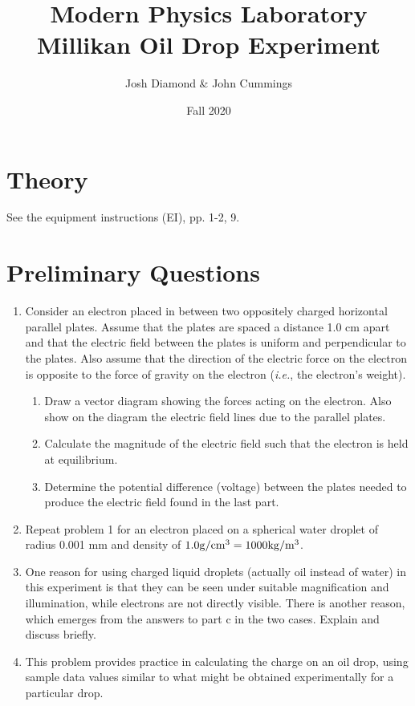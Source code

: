 \documentclass{article}
\title{Modern Physics Laboratory\\
Millikan Oil Drop Experiment}
\author{Josh Diamond \& John Cummings}
\date{Fall 2020}
\begin{document}
\maketitle


\section{Theory}

See the equipment instructions (EI), pp. 1-2, 9.

\section{Preliminary Questions}

\begin{enumerate}
\item Consider an electron placed in between two oppositely charged
horizontal parallel plates.  Assume that the plates are spaced a
distance 1.0 cm apart and that the electric field between the plates is
uniform and perpendicular to the plates.  Also assume that the
direction of the electric force on the electron is opposite to the
force of gravity on the electron ({\em i.e.}, the electron's
weight).
	\begin{enumerate}
	\item Draw a vector diagram showing the forces acting on the electron.  Also
show on the diagram the electric field lines due to the parallel plates.
	\item Calculate the magnitude of the electric field such that the electron is
held at equilibrium.
	\item Determine the potential difference (voltage) between the plates needed
to produce the electric field found in the last part.
	\end{enumerate}

\item Repeat problem 1 for an electron placed on a spherical
water droplet of radius 0.001 mm and density of $1.0 {\rm g}/{\rm cm}^3 = 1000 {\rm kg}/{\rm m}^3$.

\item One reason for using charged liquid droplets (actually oil instead of
water) in this experiment is 
that they can be seen under suitable magnification and illumination,
while electrons are not directly visible.  There is another reason,
which emerges from the answers to part c in the two cases. Explain and
discuss briefly.

\item This problem provides practice in calculating the charge on
an oil drop, using sample data values similar to what might be obtained
experimentally for a particular drop.
\end{enumerate}
\end{document}
